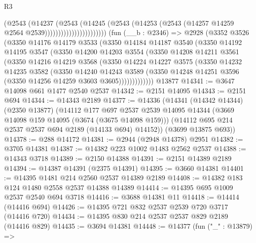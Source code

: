 \begin{lexlean}{R3}
\begin{coremodule}
                                  (@2543
                                    (@14237
                                      (@2543
                                        (@14245
                                          (@2543
                                            (@14253
                                              (@2543
                                                (@14257 @14259 @2564 @2539)))))))))))))))))))))))
    (fun (__b : @2346) =>
    @2928
      (@3352
        @3526
        (@3350
          @14176
          @14179
          @3533
          (@3350
            @14184
            @14187
            @3540
            (@3350
              @14192
              @14195
              @3547
              (@3350
                @14200
                @14203
                @3554
                (@3350
                  @14208
                  @14211
                  @3561
                  (@3350
                    @14216
                    @14219
                    @3568
                    (@3350
                      @14224
                      @14227
                      @3575
                      (@3350
                        @14232
                        @14235
                        @3582
                        (@3350
                          @14240
                          @14243
                          @3589
                          (@3350 @14248 @14251 @3596 (@3350 @14256 @14259 @3603 @3605)))))))))))))
    @13877
@14341 := @3647 @14098 @661 @1477 @2540 @2537
@14342 := @2151 @14095
@14343 := @2151 @694
@14344 := @14343 @2189
@14377 := @14336
    (@14341
      (@14342 @14344)
      (@2350 @13877)
      (@14112
        @177
        @697
        @2537
        @2539
        @14095
        @14344
        (@3669 @14098 @159 @14095 (@3674 (@3675 @14098 @159)))
        (@14112 @695 @214 @2537 @2537 @694 @2189 (@14133 @694) @14152))
      (@3699 @13875 @693))
@14378 := @288 @14172
@14381 := @2944 (@2948 @14378) @2951
@14382 := @3705 @14381
@14387 := @14382 @223 @1002 @1483 @2562 @2537
@14388 := @14343 @3718
@14389 := @2150 @14388
@14391 := @2151 @14389 @2189
@14394 := @14387 @14391 (@2375 @14391)
@14395 := @3660 @14381
@14401 := @14395 @1481 @214 @2560 @2537 @14389 @2189
@14408 := @14382 @183 @124 @1480 @2558 @2537 @14388 @14389
@14414 := @14395 @695 @1009 @2537 @2540 @694 @3718
@14416 := @3688 @14381 @11
@14418 := @14414 (@14416 @694)
@14426 := @14395 @721 @832 @2537 @2539 @720 @3717 (@14416 @720)
@14434 := @14395 @830 @214 @2537 @2537 @829 @2189 (@14416 @829)
@14435 := @3694 @14381
@14448 := @14377
    (fun ("_" : @13879) =>

\end{coremodule}
\end{lexlean}
